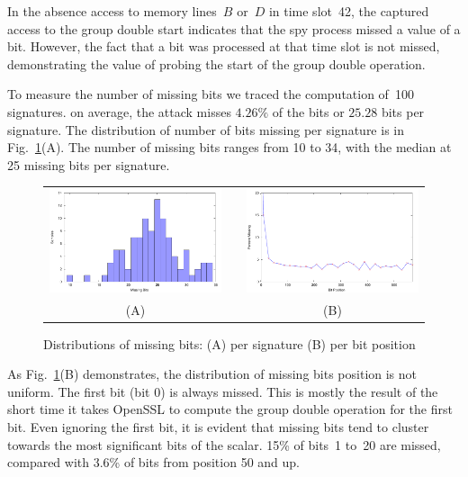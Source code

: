 \documentclass{llncs}
\begin{document}
In the absence access to memory lines~$B$ or~$D$ in time slot~42, the captured access to the group double start indicates
that the spy process missed a value of a bit.
However, the fact that a bit was processed at that time slot is not missed,
demonstrating the value of probing the start of the group double operation.

To measure the number of missing bits we traced the computation of~100 signatures.
on average, the attack misses $4.26\%$ of the bits or $25.28$ bits per signature.
The distribution of number of bits missing per signature is in Fig.~\ref{dgm:dist}(A).
The number of missing bits ranges from 10 to 34, with the median at 25 missing bits per signature.


\begin{figure}[htb]
\begin{tabular}{ccc}
\includegraphics[width=2.4in]{images/missing} &\hfill &\includegraphics[width=2.4in]{images/positions}\\
(A)& & (B)
\end{tabular}
\caption{Distributions of missing bits: (A) per signature (B) per bit position\label{dgm:dist}}
\end{figure}

As Fig.~\ref{dgm:dist}(B) demonstrates, the distribution of missing bits position is not uniform.
The first bit (bit 0) is always missed.
This is mostly the result of the short time it takes OpenSSL to compute the group double operation for the first bit.
Even ignoring the first bit, it is evident that missing bits tend to cluster towards the most significant bits of the
scalar.
15\% of bits~1 to~20 are missed, compared with 3.6\% of bits from position 50 and up.
\end{document}
